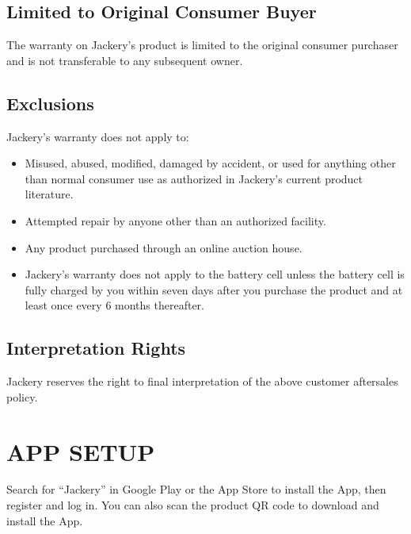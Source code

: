 \documentclass[a4paper,10pt,twoside,openany,english]{sphinxhowto}
\begin{document}
\subsection{Limited to Original Consumer Buyer}
\label{\detokenize{index:limited-to-original-consumer-buyer}}
\sphinxAtStartPar
The warranty on Jackery’s product is limited to the original consumer purchaser
and is not transferable to any subsequent owner.


\subsection{Exclusions}
\label{\detokenize{index:exclusions}}
\sphinxAtStartPar
Jackery’s warranty does not apply to:
\begin{itemize}
\item {} 
\sphinxAtStartPar
Misused, abused, modified, damaged by accident, or used for anything other than normal consumer use as authorized in Jackery’s current product literature.

\item {} 
\sphinxAtStartPar
Attempted repair by anyone other than an authorized facility.

\item {} 
\sphinxAtStartPar
Any product purchased through an online auction house.

\item {} 
\sphinxAtStartPar
Jackery’s warranty does not apply to the battery cell unless the battery cell is fully charged by you within seven days after you purchase the product and at least once every 6 months thereafter.

\end{itemize}


\subsection{Interpretation Rights}
\label{\detokenize{index:interpretation-rights}}
\sphinxAtStartPar
Jackery reserves the right to final interpretation of the above customer after\sphinxhyphen{}sales policy.



\section{APP SETUP}
\label{\detokenize{index:app-setup}}
\sphinxAtStartPar
{}

\sphinxAtStartPar
Search for “Jackery” in Google Play or the App Store to install the App, then register and log in.
You can also scan the product QR code to download and install the App.
\end{document}
